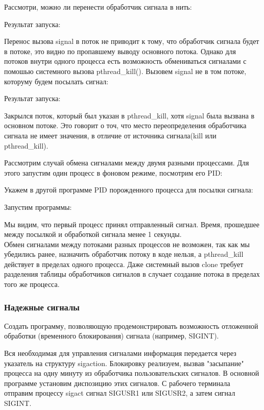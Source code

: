 \documentclass[a4paper]{article}
\begin{document}
	Рассмотри, можно ли перенести обработчик сигнала в нить:
	
	Результат запуска:
	
	Перенос вызова signal в поток не приводит к тому, что обработчик сигнала будет в потоке, это видно по пропавшему выводу основного потока. Однако для потоков внутри одного процесса есть возможность обмениваться сигналами с помошью системного вызова pthread\_kill(). Вызовем signal не в том потоке, которуму будем посылать сигнал:
	
	Результат запуска:
	
	Закрылся поток, который был указан в pthread\_kill, хотя signal была вызвана в основном потоке. Это говорит о точ, что место переопределения обработчика сигнала не имеет значения, в отличие от источника сигнала(kill или pthread\_kill). 
	
	Рассмотрим случай обмена сигналами между двумя разными процессами. Для этого запустим один процесс в фоновом режиме, посмотрим его PID:	
	

	Укажем в другой программе PID порожденного процесса для посылки сигнала:
	
	
	Запустим программы:
	
	
	Мы видим, что первый процесс принял отправленный сигнал. Время, прошедшее между посылкой и обработкой сигнала менее 1 секунды.\\
	
	Обмен сигналами между потоками разных процессов не возможен, так как мы убедились ранее, назначить обработчик потоку в коде нельзя, а pthread\_kill действует в пределах одного процесса. Даже системный вызов clone  требует разделения таблицы обработчиков сигналов в случает создание потока в пределах того же процесса.
	
	
	\subsubsection{Надежные сигналы}
	Создать программу, позволяющую продемонстрировать возможность отложенной обработки (временного блокирования) сигнала (например, SIGINT).
	
	Вся необходимая для управления сигналами информация передается через указатель на структуру sigaction. Блокировку реализуем, вызвав "засыпание" процесса на одну минуту из обработчика пользовательских сигналов. В основной программе установим диспозицию этих сигналов. С рабочего терминала отправим процессу sigact сигнал SIGUSR1 или SIGUSR2, а затем сигнал SIGINT.
	
\end{document}
